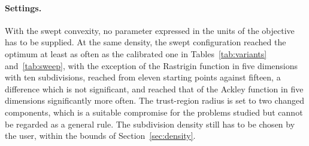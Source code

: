 \documentclass[pdflatex,sn-basic]{sn-jnl}
\begin{document}
\paragraph{Settings.} With the swept convexity, no parameter expressed in the
units of the objective has to be supplied. At the same density, the swept
configuration reached the optimum at least as often as the calibrated one in
Tables~\ref{tab:variants} and~\ref{tab:sweep}, with the
exception of the Rastrigin function in five dimensions with ten subdivisions,
reached from eleven starting points against fifteen, a difference which is not
significant, and reached that of the Ackley function in five dimensions
significantly more often. The trust-region radius is set to two changed
components, which is a suitable compromise for the problems studied but cannot
be regarded as a general rule. The subdivision density still has to be chosen
by the user, within the bounds of Section~\ref{sec:density}.
\end{document}
